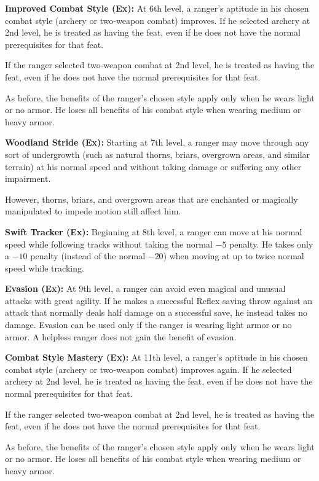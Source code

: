 \textbf{Improved Combat Style (Ex):} At 6th level, a ranger's aptitude in his chosen combat style (archery or two-weapon combat) improves. If he selected archery at 2nd level, he is treated as having the  feat, even if he does not have the normal prerequisites for that feat.

If the ranger selected two-weapon combat at 2nd level, he is treated as having the  feat, even if he does not have the normal prerequisites for that feat.

As before, the benefits of the ranger's chosen style apply only when he wears light or no armor. He loses all benefits of his combat style when wearing medium or heavy armor.

\textbf{Woodland Stride (Ex):} Starting at 7th level, a ranger may move through any sort of undergrowth (such as natural thorns, briars, overgrown areas, and similar terrain) at his normal speed and without taking damage or suffering any other impairment.

However, thorns, briars, and overgrown areas that are enchanted or magically manipulated to impede motion still affect him.

\textbf{Swift Tracker (Ex):} Beginning at 8th level, a ranger can move at his normal speed while following tracks without taking the normal $-5$ penalty. He takes only a $-10$ penalty (instead of the normal $-20$) when moving at up to twice normal speed while tracking.

\textbf{Evasion (Ex):} At 9th level, a ranger can avoid even magical and unusual attacks with great agility. If he makes a successful Reflex saving throw against an attack that normally deals half damage on a successful save, he instead takes no damage. Evasion can be used only if the ranger is wearing light armor or no armor. A helpless ranger does not gain the benefit of evasion.

\textbf{Combat Style Mastery (Ex):} At 11th level, a ranger's aptitude in his chosen combat style (archery or two-weapon combat) improves again. If he selected archery at 2nd level, he is treated as having the  feat, even if he does not have the normal prerequisites for that feat.

If the ranger selected two-weapon combat at 2nd level, he is treated as having the  feat, even if he does not have the normal prerequisites for that feat.

As before, the benefits of the ranger's chosen style apply only when he wears light or no armor. He loses all benefits of his combat style when wearing medium or heavy armor.

